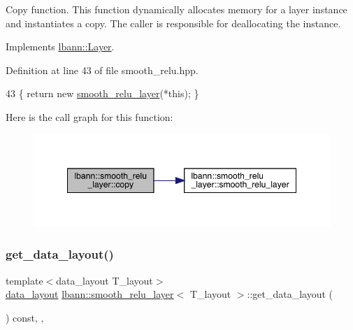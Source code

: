 Copy function. This function dynamically allocates memory for a layer instance and instantiates a copy. The caller is responsible for deallocating the instance. 

Implements \hyperlink{classlbann_1_1Layer_af420f22bbac801c85483ade84588a23f}{lbann\+::\+Layer}.



Definition at line 43 of file smooth\+\_\+relu.\+hpp.


\begin{DoxyCode}
43 \{ \textcolor{keywordflow}{return} \textcolor{keyword}{new} \hyperlink{classlbann_1_1smooth__relu__layer_aa045764ef0113d8516ddf95a3b810ce0}{smooth\_relu\_layer}(*\textcolor{keyword}{this}); \}
\end{DoxyCode}
Here is the call graph for this function\+:\nopagebreak
\begin{figure}[H]
\begin{center}
\leavevmode
\includegraphics[width=348pt]{classlbann_1_1smooth__relu__layer_af6fb922556c2debf7bec8d6f376dbe94_cgraph}
\end{center}
\end{figure}
\mbox{\label{classlbann_1_1smooth__relu__layer_a2514d7b711e0a6cbf494c5bd9a959d03}} 
\subsubsection{\texorpdfstring{get\+\_\+data\+\_\+layout()}{get\_data\_layout()}}
{\footnotesize\ttfamily template$<$data\+\_\+layout T\+\_\+layout$>$ \\
\hyperlink{base_8hpp_a786677cbfb3f5677b4d84f3056eb08db}{data\+\_\+layout} \hyperlink{classlbann_1_1smooth__relu__layer}{lbann\+::smooth\+\_\+relu\+\_\+layer}$<$ T\+\_\+layout $>$\+::get\+\_\+data\+\_\+layout (\begin{DoxyParamCaption}{ }\end{DoxyParamCaption}) const\hspace{0.3cm}{\ttfamily [inline]}, {\ttfamily [override]}, {\ttfamily [virtual]}}

